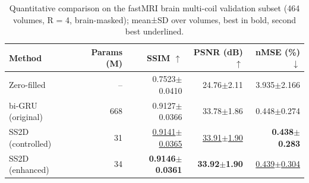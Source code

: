 \begin{table}[ht]
\centering
\caption{Quantitative comparison on the fastMRI brain multi-coil validation subset (464 volumes, R = 4, brain-masked); mean±SD over volumes, best in bold, second best underlined.}
\label{tab:main-volume}
\begin{tabular}{lrrrr}
\toprule
Method & Params (M) & SSIM $\uparrow$ & PSNR (dB) $\uparrow$ & nMSE (\%) $\downarrow$ \\
\midrule
Zero-filled & -- & 0.7523$\pm$0.0410 & 24.76$\pm$2.11 & 3.935$\pm$2.166 \\
bi-GRU (original) & 668 & 0.9127$\pm$0.0366 & 33.78$\pm$1.86 & 0.448$\pm$0.274 \\
SS2D (controlled) & 31 & \underline{0.9141$\pm$0.0365} & \underline{33.91$\pm$1.90} & \textbf{0.438$\pm$0.283} \\
SS2D (enhanced) & 34 & \textbf{0.9146$\pm$0.0361} & \textbf{33.92$\pm$1.90} & \underline{0.439$\pm$0.304} \\
\bottomrule
\end{tabular}
\end{table}
